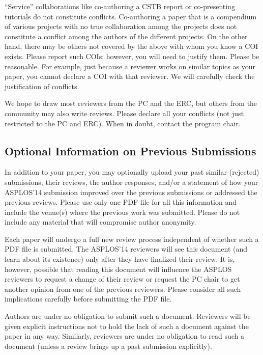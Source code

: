 \documentclass[pageno]{jpaper}
\begin{document}
``Service'' collaborations like co-authoring a CSTB report or co-presenting
tutorials do not constitute conflicts.  Co-authoring a paper that is a
compendium of various projects with no true collaboration among the
projects does not constitute a conflict among the authors of the different
projects.  On the other hand, there may be others not covered by the above
with whom you know a COI exists.  Please report such COIs; however, you
will need to justify them. Please be reasonable.  For example, just because
a reviewer works on similar topics as your paper, you cannot declare a COI
with that reviewer. We will carefully check the justification of conflicts.

We hope to draw most reviewers from the PC and the ERC, but others from the
community may also write reviews.  Please declare all your conflicts (not
just restricted to the PC and ERC).  When in doubt, contact the program
chair.


\subsection{Optional Information on Previous Submissions}

In addition to your paper, you may optionally upload your past similar
(rejected) submissions, their reviews, the author responses, and/or a
statement of how your ASPLOS'14 submission improved over the previous
submissions or addressed the previous reviews. Please use only one PDF file
for all this information and include the venue(s) where the previous work
was submitted.  Please do not include any material that will compromise
author anonymity.

Each paper will undergo a full new review process independent of whether
such a PDF file is submitted. The ASPLOS'14 reviewers will see this
document (and learn about its existence) only after they have finalized
their review.  It is, however, possible that reading this document will
influence the ASPLOS reviewers to request a change of their review or
request the PC chair to get another opinion from one of the previous
reviewers. Please consider all such implications carefully before
submitting the PDF file.

Authors are under no obligation to submit such a document. Reviewers
will be given explicit instructions not to hold the lack of such a document
against the paper in any way. Similarly, reviewers are under no obligation
to read such a document (unless a review brings up a past
submission explicitly).
\end{document}
